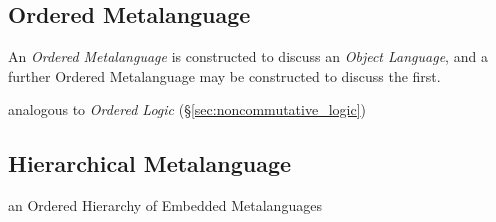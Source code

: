 \subsection{Ordered Metalanguage}\label{sec:ordered_metalanguage}

An \emph{Ordered Metalanguage} is constructed to discuss an
\emph{Object Language}, and a further Ordered Metalanguage may be
constructed to discuss the first.

analogous to \emph{Ordered Logic}
(\S\ref{sec:noncommutative_logic})



\subsection{Hierarchical Metalanguage}\label{sec:hierarchical_metalanguage}

an Ordered Hierarchy of Embedded Metalanguages
